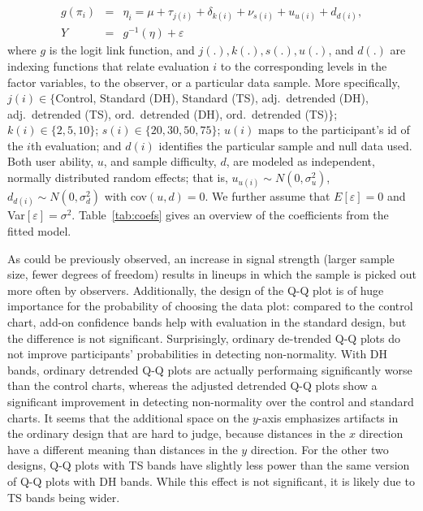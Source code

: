 \documentclass[12pt]{article}\usepackage[]{graphicx}\usepackage[]{color}
\newcommand{\hh}[1]{{\color{magenta} #1}}
\begin{document}
\begin{eqnarray} \label{eq:model}
g(\pi_i) &=& \eta_i = \mu + \tau_{j(i)} +\delta_{k(i)}+ \nu_{s(i)} + u_{u(i)} + d_{d(i)},\\ \nonumber
Y &=& g^{-1}(\eta) + \varepsilon
\end{eqnarray}
where $g$ is the logit link function, and $j(.), k(.), s(.), u(.)$, and $d(.)$ are  indexing functions that relate evaluation $i$ to the corresponding levels in the factor variables, to the observer, or a particular data sample. More specifically, $j(i) \in \{$Control, Standard (DH), Standard (TS), adj.\ detrended (DH), adj.\ detrended (TS), ord.\ detrended (DH), ord.\ detrended (TS)$\}$; $k(i) \in \{2,5,10\}$; $s(i) \in \{20, 30, 50, 75\}$; $u(i)$ maps to the participant's id of the $i$th evaluation; and $d(i)$ identifies the particular sample and null data used. 
Both user ability, $u$, and sample difficulty, $d$, are modeled as independent, normally distributed  random effects; that is, $u_{u(i)} \sim N(0, \sigma_u^2)$, $d_{d(i)} \sim N(0,\sigma_d^2)$ with cov$(u, d) = 0$. We further assume that $E[\varepsilon] = 0$ and Var$[\varepsilon]=\sigma^2$.
%
Table~\ref{tab:coefs} gives an overview of the coefficients from the fitted model.

As could be previously observed, an increase in signal strength (larger sample size, fewer degrees of freedom) results in lineups in which the sample is picked out more often by observers.
Additionally, the design of the Q-Q plot is of huge importance for the probability of choosing the data plot: compared to the control chart, add-on confidence bands help with evaluation in the standard design, but the difference is not significant.  
Surprisingly, ordinary de-trended Q-Q plots do not improve participants' probabilities %
in detecting non-normality. With DH bands, ordinary detrended Q-Q plots are actually performaing significantly worse than the control charts,
whereas the adjusted detrended Q-Q plots show a significant improvement in detecting non-normality over the control and standard charts.
It seems that the additional space on the $y$-axis emphasizes artifacts in the ordinary design that are hard to judge, because distances in the $x$ direction have a different meaning than distances in the $y$ direction. %
For the other two designs, Q-Q plots with TS bands have slightly less power than the same version of Q-Q plots with DH bands. While  this effect is not significant, it is likely due to TS bands being wider.
\end{document}
